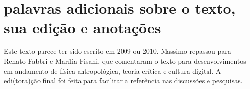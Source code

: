 \documentclass[a4paper, 12pt]{article} %
\begin{document}
\section*{palavras adicionais sobre o texto, sua edição e anotações}\label{sec:pal}
Este texto parece ter sido escrito em 2009 ou 2010. Massimo repassou para Renato Fabbri e Marília Pisani,
 que comentaram o texto para desenvolvimentos em andamento de física antropológica, teoria crítica e cultura digital.
A edi(tora)ção final foi feita para facilitar a referência nas discussões e pesquisas.


%
%



\end{document}
